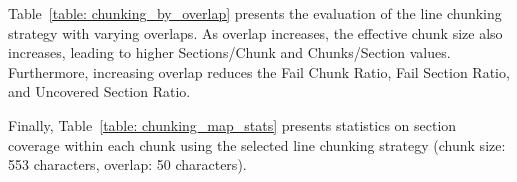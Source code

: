 Table~\ref{table: chunking_by_overlap} presents the evaluation of the line chunking strategy with varying overlaps. As overlap increases, the effective chunk size also increases, leading to higher Sections/Chunk and Chunks/Section values. Furthermore, increasing overlap reduces the Fail Chunk Ratio, Fail Section Ratio, and Uncovered Section Ratio.

\begin{table}[H]
\centering

\caption{Line chunking result by chunk overlap}
\label{table: chunking_by_overlap}
\end{table}

Finally, Table~\ref{table: chunking_map_stats} presents statistics on section coverage within each chunk using the selected line chunking strategy (chunk size: 553 characters, overlap: 50 characters).

